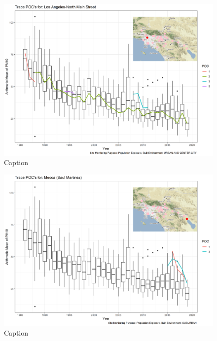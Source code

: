 \begin{figure}
    \centering
    \includegraphics[width = \textwidth]{Figures/IndividualSiteTraces/TracePOC_Los Angeles-North Main Street.png}
    \caption{Caption}
    \label{fig:my_label}
\end{figure}

\begin{figure}
    \centering
    \includegraphics[width = \textwidth]{Figures/IndividualSiteTraces/TracePOC_Mecca (Saul Martinez).png}
    \caption{Caption}
    \label{fig:my_label}
\end{figure}

